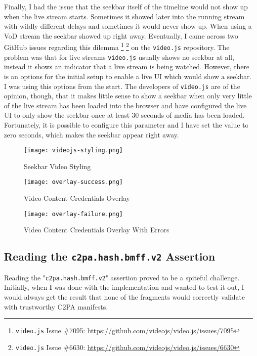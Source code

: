 Finally, I had the issue that the seekbar itself of the timeline would not show up when the live stream starts. Sometimes it showed later into the running stream with wildly different delays and sometimes it would never show up. When using a VoD stream the seekbar showed up right away. Eventually, I came across two GitHub issues regarding this dilemma \footnote{\texttt{video.js} Issue \#7095: \url{https://github.com/videojs/video.js/issues/7095}} \footnote{\texttt{video.js} Issue \#6630: \url{https://github.com/videojs/video.js/issues/6630}} on the \texttt{video.js} repository. The problem was that for live streams \texttt{video.js} usually shows no seekbar at all, instead it shows an indicator that a live stream is being watched. However, there is an options for the initial setup to enable a live UI which would show a seekbar. I was using this options from the start. The developers of \texttt{video.js} are of the opinion, though, that it makes little sense to show a seekbar when only very little of the live stream has been loaded into the browser and have configured the live UI to only show the seekbar once at least 30 seconds of media has been loaded. Fortunately, it is possible to configure this parameter and I have set the value to zero seconds, which makes the seekbar appear right away.

\begin{figure}
    \texttt{[image: videojs-styling.png]}
    \caption{Seekbar Video Styling}
    \label{fig:seekbar}
\end{figure}
\begin{figure}
    \texttt{[image: overlay-success.png]}
    \caption{Video Content Credentials Overlay}
    \label{fig:overlay-success}
\end{figure}
\begin{figure}
    \texttt{[image: overlay-failure.png]}
    \caption{Video Content Credentials Overlay With Errors}
    \label{fig:overlay-failure}
\end{figure}

\subsection{Reading the \texttt{c2pa.hash.bmff.v2} Assertion}

Reading the "\texttt{c2pa.hash.bmff.v2}" assertion proved to be a spiteful challenge. Initially, when I was done with the implementation and wanted to test it out, I would always get the result that none of the fragments would correctly validate with trustworthy C2PA manifests.

